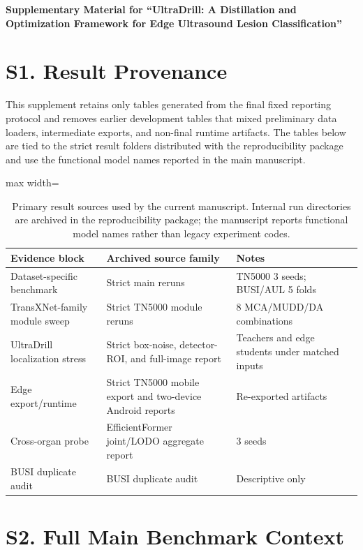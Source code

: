 \documentclass[preprint,12pt]{elsarticle}
\newcommand{\suppsection}[1]{\Needspace{0.35\textheight}\section*{#1}}
\begin{document}
\begin{center}
{\Large\bfseries Supplementary Material for ``UltraDrill: A Distillation and Optimization Framework for Edge Ultrasound Lesion Classification''\par}
\end{center}
\vspace{1em}

\suppsection{S1. Result Provenance}

This supplement retains only tables generated from the final fixed reporting protocol and removes earlier development tables that mixed preliminary data loaders, intermediate exports, and non-final runtime artifacts. The tables below are tied to the strict result folders distributed with the reproducibility package and use the functional model names reported in the main manuscript.

\begin{table}[H]
    \centering
    \small
    \caption{Primary result sources used by the current manuscript. Internal run directories are archived in the reproducibility package; the manuscript reports functional model names rather than legacy experiment codes.}
    \label{tab:s_sources}
    \begin{adjustbox}{max width=\columnwidth}
    \begin{tabular}{lll}
        \toprule
        Evidence block & Archived source family & Notes \\
        \midrule
        Dataset-specific benchmark & Strict main reruns & TN5000 3 seeds; BUSI/AUL 5 folds \\
        TransXNet-family module sweep & Strict TN5000 module reruns & 8 MCA/MUDD/DA combinations \\
        UltraDrill localization stress & Strict box-noise, detector-ROI, and full-image report & Teachers and edge students under matched inputs \\
        Edge export/runtime & Strict TN5000 mobile export and two-device Android reports & Re-exported artifacts \\
        Cross-organ probe & EfficientFormer joint/LODO aggregate report & 3 seeds \\
        BUSI duplicate audit & BUSI duplicate audit & Descriptive only \\
        \bottomrule
    \end{tabular}
    \end{adjustbox}
\end{table}

\suppsection{S2. Full Main Benchmark Context}
\end{document}
